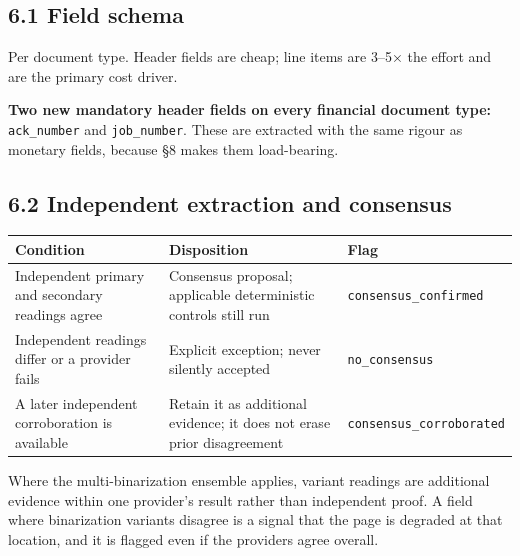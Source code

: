 \documentclass[
]{article}
\newcounter{none} %
\begin{document}
\subsection{6.1 Field schema}\label{field-schema}

Per document type. Header fields are cheap; line items are 3--5× the
effort and are the primary cost driver.

\textbf{Two new mandatory header fields on every financial document
type:} \texttt{ack\_\allowbreak{}number} and
\texttt{job\_\allowbreak{}number}. These are extracted with the same
rigour as monetary fields, because §8 makes them load-bearing.

\subsection{6.2 Independent extraction and
consensus}\label{independent-extraction-and-consensus}

{\def\LTcaptype{none} %
\begin{longtable}[]{@{}
  >{\raggedright\arraybackslash}p{}
  >{\raggedright\arraybackslash}p{}
  >{\raggedright\arraybackslash}p{}@{}}
\toprule\noalign{}
\begin{minipage}[b]{\linewidth}\raggedright
Condition
\end{minipage} & \begin{minipage}[b]{\linewidth}\raggedright
Disposition
\end{minipage} & \begin{minipage}[b]{\linewidth}\raggedright
Flag
\end{minipage} \\
\midrule\noalign{}
\endhead
\bottomrule\noalign{}
\endlastfoot
Independent primary and secondary readings agree & Consensus proposal;
applicable deterministic controls still run &
\texttt{consensus\_\allowbreak{}confirmed} \\
Independent readings differ or a provider fails & Explicit exception;
never silently accepted & \texttt{no\_\allowbreak{}consensus} \\
A later independent corroboration is available & Retain it as additional
evidence; it does not erase prior disagreement &
\texttt{consensus\_\allowbreak{}corroborated} \\
\end{longtable}
}

Where the multi-binarization ensemble applies, variant readings are
additional evidence within one provider's result rather than independent
proof. A field where binarization variants disagree is a signal that the
page is degraded at that location, and it is flagged even if the
providers agree overall.
\end{document}
